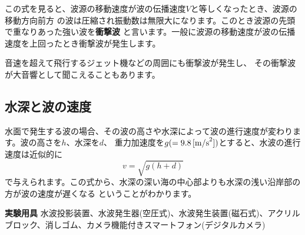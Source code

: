 この式を見ると、波源の移動速度が波の伝播速度$V$と等しくなったとき、波源の移動方向前方
の波は圧縮され振動数は無限大になります。このとき波源の先頭で重なりあった強い波を{\bf 衝撃波}
と言います。一般に波源の移動速度が波の伝播速度を上回ったとき衝撃波が発生します。

音速を超えて飛行するジェット機などの周囲にも衝撃波が発生し、
その衝撃波が大音響として聞こえることもあります。

\subsection{水深と波の速度}

水面で発生する波の場合、その波の高さや水深によって波の進行速度が変わります。波の高さを$h$、水深を$d$、
重力加速度を$g(=9.8\, [{\rm m/s}^2])$とすると、水波の進行速度は近似的に
\[
v = \sqrt{g(h+d)}
\]
で与えられます。この式から、水深の深い海の中心部よりも水深の浅い沿岸部の方が波の速度が遅くなる
ということがわかります。

\newpage

\jikken

\begin{itemsquarebox}[c]{\bf 実験用具}
水波投影装置、水波発生器(空圧式)、水波発生装置(磁石式)、アクリルブロック、消しゴム、カメラ機能付きスマートフォン(デジタルカメラ)
\end{itemsquarebox}

\bigskip


